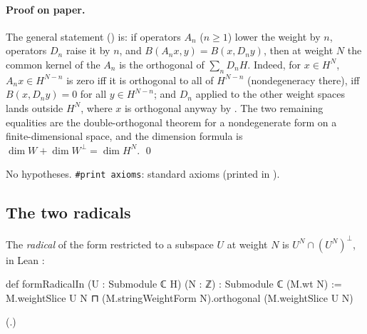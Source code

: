 \paragraph{Proof on paper.}  The general statement () is: if
operators $A_n$ ($n\ge1$) lower the weight by $n$, operators $D_n$ raise it by $n$, and $B(A_nx,y)=B(x,D_ny)$,
then at weight $N$ the common kernel of the $A_n$ is the orthogonal of $\sum_n D_nH$.  Indeed, for
$x\in H^N$, $A_nx\in H^{N-n}$ is zero iff it is orthogonal to all of $H^{N-n}$ (nondegeneracy there), iff
$B(x,D_ny)=0$ for all $y\in H^{N-n}$; and $D_n$ applied to the other weight spaces lands outside $H^N$, where
$x$ is orthogonal anyway by .  The two remaining equalities are the double-orthogonal
theorem for a nondegenerate form on a finite-dimensional space, and the dimension formula is
$\dim W+\dim W^\perp=\dim H^N$. \qed

\begin{status}
No hypotheses.  \texttt{\#print axioms}: standard axioms (printed in ).
\end{status}

\subsection{The two radicals}

The \emph{radical} of the form restricted to a subspace $U$ at weight $N$ is
$U^N\cap(U^N)^\perp$, in Lean :
\begin{leancode}
def formRadicalIn (U : Submodule ℂ H) (N : ℤ) : Submodule ℂ (M.wt N) :=
  M.weightSlice U N ⊓ (M.stringWeightForm N).orthogonal (M.weightSlice U N)
\end{leancode}
(.)

